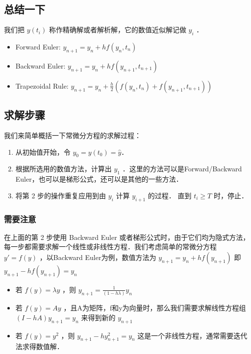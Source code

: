 \subsection{总结一下}

我们把 $y(t_i)$ 称作精确解或者解析解，它的数值近似解记做 $y_i$ ．
\begin{itemize}
\item Forward Euler: $y_{n+1}=y_n+hf(y_n,t_n)$ 
\item Backward Euler: $y_{n+1}=y_n+hf(y_{n+1},t_{n+1})$ 
\item Trapezoidal Rule: $y_{n+1}=y_n+\frac{h}{2}\left(f(y_n,t_n)+f(y_{n+1},t_{n+1}) \right)$ 
\end{itemize}


\subsection{求解步骤}

我们来简单概括一下常微分方程的求解过程：

\begin{enumerate}
\item 从初始值开始，令 $y_0=y(t_0)=\hat{y}$．
\item 根据所选用的数值方法，计算出 $y_1$ ．这里的方法可以是Forward/Backward Euler，也可以是梯形公式，还可以是其他的一些方法．
\item 将第 2 步的操作重复应用到由 $y_i$ 计算 $y_{i+1}$ 的过程． 直到 $t_i\ge T$ 时，停止．
\end{enumerate}

\subsubsection{需要注意}

在上面的第 2 步使用 Backward Euler 或者梯形公式时，由于它们均为隐式方法，每一步都需要求解一个线性或非线性方程．我们考虑简单的常微分方程 $y'=f(y)$ ，以Backward Euler为例，数值方法为 $y_{n+1}=y_{n}+hf(y_{n+1})$ 即 $y_{n+1}-hf(y_{n+1})=y_{n}$ 

\begin{itemize}
\item 若 $f(y)=\lambda y$ ，则 $y_{n+1}=\frac{1}{(1-h\lambda)}y_n$ 
\item 若 $f(y)=A y$ ，且A为矩阵，f和y为向量时，那么我们需要求解线性方程组 $(I-hA)y_{n+1}=y_n$ 来得到新的 $y_{n+1}$
\item 若 $f(y)=y^2$ ，则 $y_{n+1}-hy^2_{n+1} = y_n$ 这是一个非线性方程，通常需要迭代法求得数值解．
\end{itemize}

